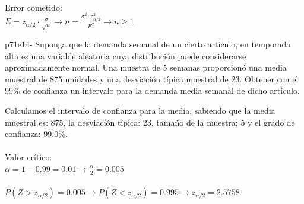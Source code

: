 \documentclass[spanish, 11pt]{exam}
\begin{document}
\begin{questions}
\begin{solution}
     \\
    Error cometido: \\ $E=z_{\alpha/2}\cdot \frac{\sigma}{\sqrt{n}} \to n =\frac{\sigma^2 \cdot z_{\alpha / 2}^2}{E^2} \to n \geq1$ \\    \end{solution}\question p71e14- Suponga que la demanda semanal de un cierto artículo, en temporada alta es una variable aleatoria cuya
distribución puede considerarse aproximadamente normal.
Una muestra de 5 semanas proporcionó una media muestral de 875 unidades y una desviación típica
muestral de 23. Obtener con el 99\% de confianza un intervalo para la demanda media semanal de dicho
artículo. \begin{solution}   Calculamos el intervalo de confianza para la media, sabiendo que la media muestral es: 875, la desviación típica: 23, tamaño de la muestra: 5 y el grado de confianza: 99.0\%. \\ \\ Valor crítico: \\ $\alpha=1-0.99=0.01\to \frac{\alpha}{2}=0.005$ \\ \\ $P(Z>z_{\alpha/2})=0.005\to P(Z<z_{\alpha/2})=0.995 \to z_{\alpha/2} =2.5758$ \\ 
\end{solution}
\end{questions}
\end{document}

